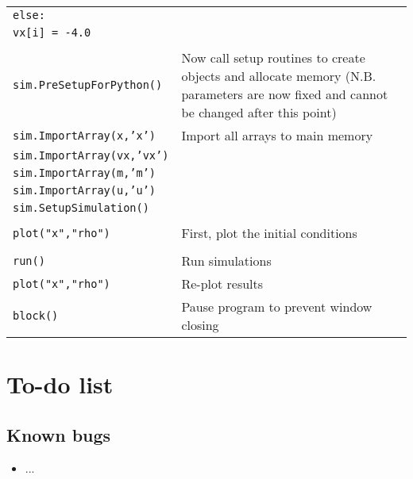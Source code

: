 \documentclass[a4paper]{article}
\newcommand{\var}[1]{\texttt{#1}}
\begin{document}
\begin{tabular}{p{9cm}p{6.0cm}}
\hspace{0.5cm}\var{else:} & \\
\hspace{1cm}\var{vx[i] = -4.0} & \\
& \\  
\var{sim.PreSetupForPython()}  & Now call setup routines to create objects and allocate memory 
(N.B. parameters are now fixed and cannot be changed after this point) \\
\var{sim.ImportArray(x,'x')}    & Import all arrays to main memory \\
\var{sim.ImportArray(vx,'vx')}  & \\
\var{sim.ImportArray(m,'m')}    & \\
\var{sim.ImportArray(u,'u')}    & \\
\var{sim.SetupSimulation()}     & \\
& \\                                  
\var{plot("x","rho")}           & First, plot the initial conditions \\ 
& \\              
\var{run()}                     & Run simulations \\
\var{plot("x","rho")}           & Re-plot results \\
\var{block()}                   & Pause program to prevent window closing \\
\end{tabular}
\newline




\section{To-do list}

\subsection{Known bugs}
\begin{itemize}
\item ...
\end{itemize}
\end{document}

